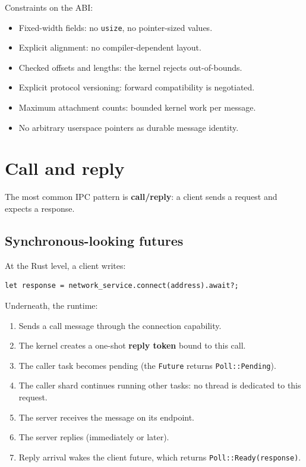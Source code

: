 Constraints on the ABI:

\begin{itemize}
    \item Fixed-width fields: no \texttt{usize}, no pointer-sized values.
    \item Explicit alignment: no compiler-dependent layout.
    \item Checked offsets and lengths: the kernel rejects out-of-bounds.
    \item Explicit protocol versioning: forward compatibility is negotiated.
    \item Maximum attachment counts: bounded kernel work per message.
    \item No arbitrary userspace pointers as durable message identity.
\end{itemize}

\section{Call and reply}

The most common IPC pattern is \textbf{call/reply}: a client sends a request and
expects a response.

\subsection{Synchronous-looking futures}

At the Rust level, a client writes:


\begin{lstlisting}[style=rustCode]
let response = network_service.connect(address).await?;
\end{lstlisting}

Underneath, the runtime:

\begin{enumerate}
    \item Sends a call message through the connection capability.
    \item The kernel creates a one-shot \textbf{reply token} bound to this call.
    \item The caller task becomes pending (the \texttt{Future} returns
        \texttt{Poll::Pending}).
    \item The caller shard continues running other tasks: no thread is
        dedicated to this request.
    \item The server receives the message on its endpoint.
    \item The server replies (immediately or later).
    \item Reply arrival wakes the client future, which returns
        \texttt{Poll::Ready(response)}.
\end{enumerate}

